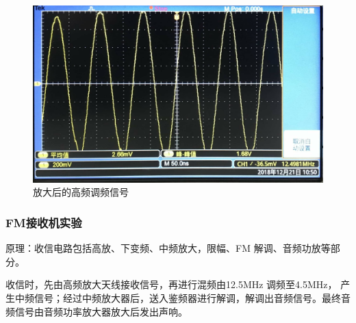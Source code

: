 \documentclass[12pt]{article}%
\numberwithin{equation}{section}
\begin{document}
\begin{enumerate}[1.]
 \begin{figure}[htbp]
  \centering
  \includegraphics[width=.45\textwidth]{gaopin6/gaopin607.jpg}
  \caption{放大后的高频调频信号 } 
  \label{fig:f6} 
\end{figure}
\end{enumerate}
\subsubsection{FM接收机实验}
原理：收信电路包括高放、下变频、中频放大，限幅、FM 解调、音频功放等部分。\par
收信时，先由高频放大天线接收信号，再进行混频由12.5MHz 调频至4.5MHz，
产生中频信号；经过中频放大器后，送入鉴频器进行解调，解调出音频信号。最终音频信号由音频功率放大器放大后发出声响。
\end{document}
